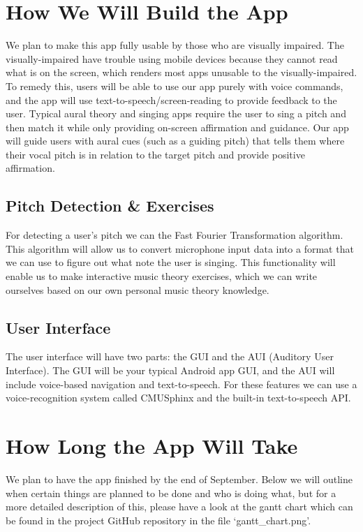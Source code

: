 \documentclass{article}
\begin{document}
\section{How We Will Build the App}
We plan to make this app fully usable by those who are visually impaired. The visually-impaired have trouble using mobile devices because they cannot read what is on the screen, which renders most apps unusable to the visually-impaired. To remedy this, users will be able to use our app purely with voice commands, and the app will use text-to-speech/screen-reading to provide feedback to the user. Typical aural theory and singing apps require the user to sing a pitch and then match it while only providing on-screen affirmation and guidance. Our app will guide users with aural cues (such as a guiding pitch) that tells them where their vocal pitch is in relation to the target pitch and provide positive affirmation.

\subsection{Pitch Detection \& Exercises}
For detecting a user's pitch we can the Fast Fourier Transformation algorithm. This algorithm will allow us to convert microphone input data into a format that we can use to figure out what note the user is singing. This functionality will enable us to make interactive music theory exercises, which we can write ourselves based on our own personal music theory knowledge. 
\subsection{User Interface}
The user interface will have two parts: the GUI and the AUI (Auditory User Interface). The GUI will be your typical Android app GUI, and the AUI will include voice-based navigation and text-to-speech. For these features we can use a voice-recognition system called CMUSphinx and the built-in text-to-speech API.

\section{How Long the App Will Take}
We plan to have the app finished by the end of September. Below we will outline when certain things are planned to be done and who is doing what, but for a more detailed description of this, please have a look at the gantt chart which can be found in the project GitHub repository in the file `gantt\_chart.png'.
\end{document}
